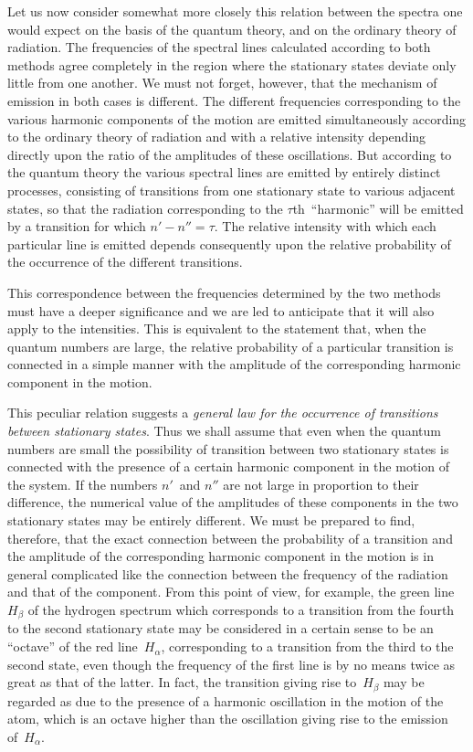  Let us now consider somewhat
more closely this relation between the spectra one would expect on
the basis of the quantum theory, and on the ordinary theory of
radiation. The frequencies of the spectral lines calculated according
to both methods agree completely in the region where the stationary
states deviate only little from one another. We must not forget,
however, that the mechanism of emission in both cases is different.
The different frequencies corresponding to the various harmonic
components of the motion are emitted simultaneously according to
the ordinary theory of radiation and with a relative intensity depending
directly upon the ratio of the amplitudes of these oscillations.
But according to the quantum theory the various spectral
lines are emitted by entirely distinct processes, consisting of transitions
from one stationary state to various adjacent states, so that
the radiation corresponding to the $\tau$th~``harmonic'' will be emitted
by a transition for which $n' - n'' = \tau$. The relative intensity
with which each particular line is emitted depends consequently
upon the relative probability of the occurrence of the different
transitions.

This correspondence between the frequencies determined by the
two methods must have a deeper significance and we are led to
anticipate that it will also apply to the intensities. This is equivalent
to the statement that, when the quantum numbers are large,
the relative probability of a particular transition is connected in a
simple manner with the amplitude of the corresponding harmonic
component in the motion.

This peculiar relation suggests a \emph{general law for the occurrence
of transitions between stationary states}. Thus we shall assume that
even when the quantum numbers are small the possibility of
transition between two stationary states is connected with the
presence of a certain harmonic component in the motion of the
system. If the numbers $n'$~and $n''$ are not large in proportion to
their difference, the numerical value of the amplitudes of these
components in the two stationary states may be entirely different.
We must be prepared to find, therefore, that the exact connection
between the probability of a transition and the amplitude of the
corresponding harmonic component in the motion is in general
complicated like the connection between the frequency of the radiation
and that of the component. From this point of view, for
example, the green line~$H_{\beta}$ of the hydrogen spectrum which corresponds
to a transition from the fourth to the second stationary
state may be considered in a certain sense to be an ``octave'' of the
red line~$H_{\alpha}$, corresponding to a transition from the third to the
second state, even though the frequency of the first line is by no
means twice as great as that of the latter. In fact, the transition
giving rise to~$H_{\beta}$ may be regarded as due to the presence of a harmonic
oscillation in the motion of the atom, which is an octave
higher than the oscillation giving rise to the emission of~$H_{\alpha}$.

